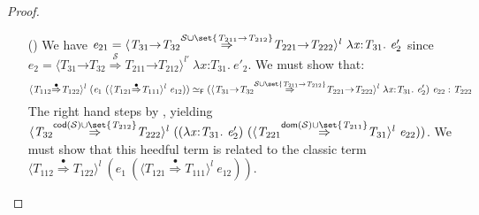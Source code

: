 \documentclass[9pt]{extarticle}
\newcommand{\ottnt}[1]{\mathit{#1}}
\newcommand{\ottsym}[1]{#1}
\begin{document}
{\begin{lemma}
\begin{proof}
{\begin{itemize}
\begin{itemize}
      \item[(\E{CastMerge})] We have $\ottnt{e_{{\mathrm{21}}}}  \ottsym{=}   \langle   \ottnt{T_{{\mathrm{31}}}} \mathord{ \rightarrow } \ottnt{T_{{\mathrm{32}}}}   \mathord{ \overset{  \mathcal{S}  \cup   \set{   \ottnt{T_{{\mathrm{211}}}} \mathord{ \rightarrow } \ottnt{T_{{\mathrm{212}}}}   }   }{\Rightarrow} }   \ottnt{T_{{\mathrm{221}}}} \mathord{ \rightarrow } \ottnt{T_{{\mathrm{222}}}}   \rangle^{ \ottnt{l} } ~   \lambda \mathit{x} \mathord{:} \ottnt{T_{{\mathrm{31}}}} .~  \ottnt{e'_{{\mathrm{2}}}}  $ since $\ottnt{e_{{\mathrm{2}}}}  \ottsym{=}   \langle   \ottnt{T_{{\mathrm{31}}}} \mathord{ \rightarrow } \ottnt{T_{{\mathrm{32}}}}   \mathord{ \overset{ \mathcal{S} }{\Rightarrow} }   \ottnt{T_{{\mathrm{211}}}} \mathord{ \rightarrow } \ottnt{T_{{\mathrm{212}}}}   \rangle^{ \ottnt{l'} } ~   \lambda \mathit{x} \mathord{:} \ottnt{T_{{\mathrm{31}}}} .~  \ottnt{e'_{{\mathrm{2}}}}  $.  
We must show that:
\[   \langle  \ottnt{T_{{\mathrm{112}}}}  \mathord{ \overset{\bullet}{\Rightarrow} }  \ottnt{T_{{\mathrm{122}}}}  \rangle^{ \ottnt{l} } ~   (  \ottnt{e_{{\mathrm{1}}}} ~  (  \langle  \ottnt{T_{{\mathrm{121}}}}  \mathord{ \overset{\bullet}{\Rightarrow} }  \ottnt{T_{{\mathrm{111}}}}  \rangle^{ \ottnt{l} } ~  \ottnt{e_{{\mathrm{12}}}}  )   )     \simeq _{  \mathsf{F}  }    (  \langle   \ottnt{T_{{\mathrm{31}}}} \mathord{ \rightarrow } \ottnt{T_{{\mathrm{32}}}}   \mathord{ \overset{  \mathcal{S}  \cup   \set{   \ottnt{T_{{\mathrm{211}}}} \mathord{ \rightarrow } \ottnt{T_{{\mathrm{212}}}}   }   }{\Rightarrow} }   \ottnt{T_{{\mathrm{221}}}} \mathord{ \rightarrow } \ottnt{T_{{\mathrm{222}}}}   \rangle^{ \ottnt{l} } ~   \lambda \mathit{x} \mathord{:} \ottnt{T_{{\mathrm{31}}}} .~  \ottnt{e'_{{\mathrm{2}}}}   )  ~ \ottnt{e_{{\mathrm{22}}}}   :  \ottnt{T_{{\mathrm{222}}}}  \]
The right hand steps by ,
        yielding $ \langle  \ottnt{T_{{\mathrm{32}}}}  \mathord{ \overset{   \mathsf{cod} ( \mathcal{S} )   \cup   \set{  \ottnt{T_{{\mathrm{212}}}}  }   }{\Rightarrow} }  \ottnt{T_{{\mathrm{222}}}}  \rangle^{ \ottnt{l} } ~   (   (  \lambda \mathit{x} \mathord{:} \ottnt{T_{{\mathrm{31}}}} .~  \ottnt{e'_{{\mathrm{2}}}}  )  ~  (  \langle  \ottnt{T_{{\mathrm{221}}}}  \mathord{ \overset{   \mathsf{dom} ( \mathcal{S} )   \cup   \set{  \ottnt{T_{{\mathrm{211}}}}  }   }{\Rightarrow} }  \ottnt{T_{{\mathrm{31}}}}  \rangle^{ \ottnt{l} } ~  \ottnt{e_{{\mathrm{22}}}}  )   )  $. We must show that this heedful term is related to
        the classic term $ \langle  \ottnt{T_{{\mathrm{112}}}}  \mathord{ \overset{\bullet}{\Rightarrow} }  \ottnt{T_{{\mathrm{122}}}}  \rangle^{ \ottnt{l} } ~   (  \ottnt{e_{{\mathrm{1}}}} ~  (  \langle  \ottnt{T_{{\mathrm{121}}}}  \mathord{ \overset{\bullet}{\Rightarrow} }  \ottnt{T_{{\mathrm{111}}}}  \rangle^{ \ottnt{l} } ~  \ottnt{e_{{\mathrm{12}}}}  )   )  $.


\end{itemize}
\end{itemize}}
\end{proof}
\end{lemma}}
\end{document}
